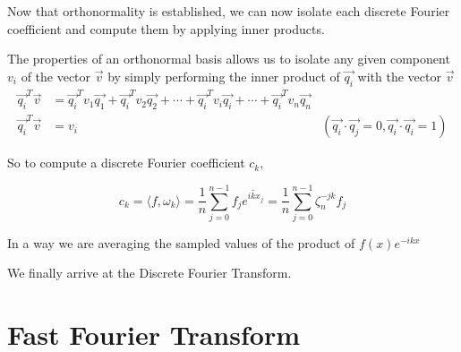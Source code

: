 \documentclass[twoside]{article}
\begin{document}
Now that orthonormality is established, we can now isolate each discrete Fourier coefficient and compute them by applying inner products.

The properties of an orthonormal basis allows us to isolate any given component $v_i$ of the vector $\vec{v}$ by simply performing the inner product of $\vec{q_i}$ with the vector $\vec{v}$
\begin{align*}
	\vec{q_i}^T\vec{v} &= \vec{q_i}^T v_1 \vec{q_1} + \vec{q_i}^T v_2 \vec{q_2} + \cdots + \vec{q_i}^T v_i \vec{q_i} + \cdots + \vec{q_i}^T v_n \vec{q_n} \\
	\vec{q_i}^T \vec{v} &= v_i &(\vec{q_i}\cdot \vec{q_j} = 0, \vec{q_i} \cdot \vec{q_i} = 1)
\end{align*}


So to compute a discrete Fourier coefficient $c_k$,

\[
	c_k = \langle f, \omega_k \rangle = \frac{1}{n} \sum_{j=0}^{n-1} f_j \overline{e^{ikx_j}} = \frac{1}{n} \sum_{j=0}^{n-1} \zeta_n^{-jk} f_j
\]

In a way we are averaging the sampled values of the product of $f(x) e^{-ikx}$

We finally arrive at the Discrete Fourier Transform.
\section{Fast Fourier Transform}
\end{document}

